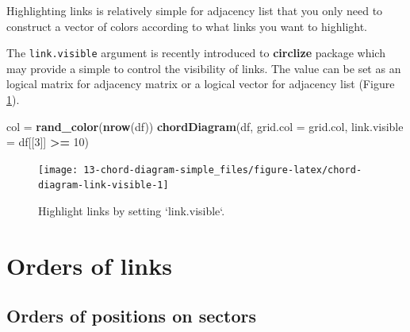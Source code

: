 \documentclass[]{book}
\newenvironment{Shaded}{\begin{snugshade}}{\end{snugshade}}
\newcommand{\KeywordTok}[1]{\textcolor[rgb]{0.13,0.29,0.53}{\textbf{#1}}}
\newcommand{\DataTypeTok}[1]{\textcolor[rgb]{0.13,0.29,0.53}{#1}}
\newcommand{\DecValTok}[1]{\textcolor[rgb]{0.00,0.00,0.81}{#1}}
\newcommand{\StringTok}[1]{\textcolor[rgb]{0.31,0.60,0.02}{#1}}
\newcommand{\OperatorTok}[1]{\textcolor[rgb]{0.81,0.36,0.00}{\textbf{#1}}}
\newcommand{\NormalTok}[1]{#1}
\begin{document}
Highlighting links is relatively simple for adjacency list that you only
need to construct a vector of colors according to what links you want to
highlight.

\begin{Shaded}
\end{Shaded}

The \texttt{link.visible} argument is recently introduced to
\textbf{circlize} package which may provide a simple to control the
visibility of links. The value can be set as an logical matrix for
adjacency matrix or a logical vector for adjacency list (Figure
\ref{fig:chord-diagram-link-visible}).

\begin{Shaded}
\begin{Highlighting}[]
\NormalTok{col =}\StringTok{ }\KeywordTok{rand_color}\NormalTok{(}\KeywordTok{nrow}\NormalTok{(df))}
\KeywordTok{chordDiagram}\NormalTok{(df, }\DataTypeTok{grid.col =}\NormalTok{ grid.col, }\DataTypeTok{link.visible =}\NormalTok{ df[[}\DecValTok{3}\NormalTok{]] }\OperatorTok{>=}\StringTok{ }\DecValTok{10}\NormalTok{)}
\end{Highlighting}
\end{Shaded}

\begin{figure}

{\centering \texttt{[image: 13-chord-diagram-simple\_files/figure-latex/chord-diagram-link-visible-1]} 

}

\caption{Highlight links by setting `link.visible`.}\label{fig:chord-diagram-link-visible}
\end{figure}

\section{Orders of links}\label{orders-of-links}

\subsection{Orders of positions on
sectors}\label{orders-of-positions-on-sectors}
\end{document}
